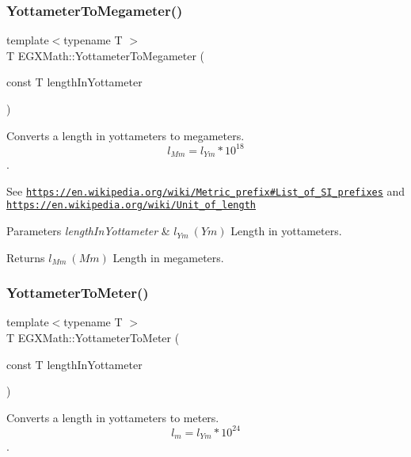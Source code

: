 \subsubsection{\texorpdfstring{Yottameter\+To\+Megameter()}{YottameterToMegameter()}}
{\footnotesize\ttfamily template$<$typename T $>$ \\
T E\+G\+X\+Math\+::\+Yottameter\+To\+Megameter (\begin{DoxyParamCaption}\item[{const T}]{length\+In\+Yottameter }\end{DoxyParamCaption})}



Converts a length in yottameters to megameters. \[ l_{Mm}=l_{Ym} * 10^{18} \]. 

See \href{https://en.wikipedia.org/wiki/Metric_prefix#List_of_SI_prefixes}{\tt https\+://en.\+wikipedia.\+org/wiki/\+Metric\+\_\+prefix\#\+List\+\_\+of\+\_\+\+S\+I\+\_\+prefixes} and \href{https://en.wikipedia.org/wiki/Unit_of_length}{\tt https\+://en.\+wikipedia.\+org/wiki/\+Unit\+\_\+of\+\_\+length} 
\begin{DoxyParams}{Parameters}
{\em length\+In\+Yottameter} & $ l_{Ym}\ (Ym)$ Length in yottameters. \\
\hline
\end{DoxyParams}
\begin{DoxyReturn}{Returns}
$ l_{Mm}\ (Mm)$ Length in megameters. 
\end{DoxyReturn}
\mbox{\label{group___e_g_x_math-_conversions-_length_conversions-_yottameter-_s_i_ga01c4f2e699cc2b062bdd2e81073a7ef2}} 
\subsubsection{\texorpdfstring{Yottameter\+To\+Meter()}{YottameterToMeter()}}
{\footnotesize\ttfamily template$<$typename T $>$ \\
T E\+G\+X\+Math\+::\+Yottameter\+To\+Meter (\begin{DoxyParamCaption}\item[{const T}]{length\+In\+Yottameter }\end{DoxyParamCaption})}



Converts a length in yottameters to meters. \[ l_{m}=l_{Ym} * 10^{24} \]. 


